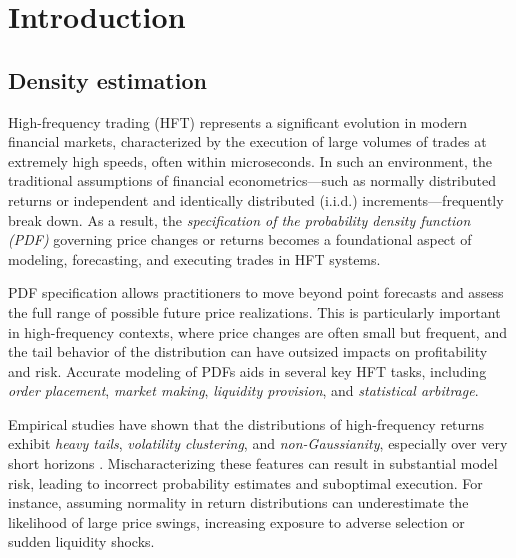 \documentclass[
	12pt,				%
	oneside,			%
	a4paper,			%
	english,			%
	brazil				%
	]{abntex2ppgsi}
\begin{document}
\tableofcontents*
\cleardoublepage



\textual



% 
%
%
\chapter{Introduction}
\section{Density estimation}
High-frequency trading (HFT) represents a significant evolution in modern financial markets, characterized by the execution of large volumes of trades at extremely high speeds, often within microseconds. In such an environment, the traditional assumptions of financial econometrics—such as normally distributed returns or independent and identically distributed (i.i.d.) increments—frequently break down. As a result, the \textit{specification of the probability density function (PDF)} governing price changes or returns becomes a foundational aspect of modeling, forecasting, and executing trades in HFT systems.

PDF specification allows practitioners to move beyond point forecasts and assess the full range of possible future price realizations. This is particularly important in high-frequency contexts, where price changes are often small but frequent, and the tail behavior of the distribution can have outsized impacts on profitability and risk. Accurate modeling of PDFs aids in several key HFT tasks, including \textit{order placement}, \textit{market making}, \textit{liquidity provision}, and \textit{statistical arbitrage}.

Empirical studies have shown that the distributions of high-frequency returns exhibit \textit{heavy tails}, \textit{volatility clustering}, and \textit{non-Gaussianity}, especially over very short horizons . Mischaracterizing these features can result in substantial model risk, leading to incorrect probability estimates and suboptimal execution. For instance, assuming normality in return distributions can underestimate the likelihood of large price swings, increasing exposure to adverse selection or sudden liquidity shocks.
\end{document}
